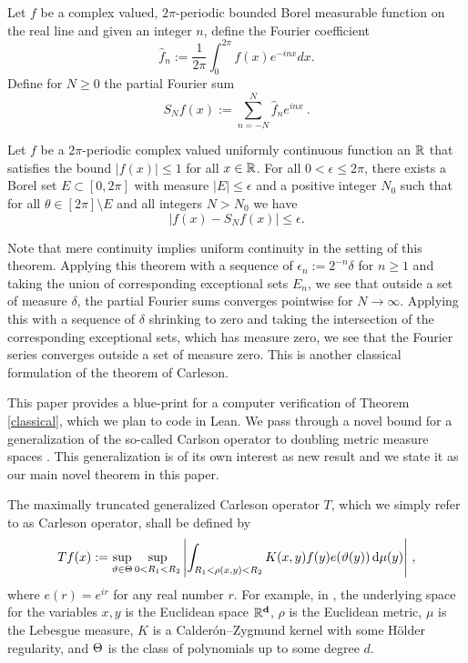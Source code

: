Let $f$ be a complex valued, $2\pi $-periodic bounded Borel measurable function on the real line and given an integer $n$, define the Fourier coefficient
\begin{equation}
    \widehat{f}_n:=\frac {1}{2\pi} \int_0^{2\pi} f(x) e^{- i nx} dx .
\end{equation}
Define for $N\ge 0$ the partial Fourier sum
\begin{equation}
    S_Nf(x):=\sum_{n=-N}^N \widehat{f}_n e^{i nx}\ .
\end{equation}
\begin{theorem}\label{classical}
Let $f$ be a $2\pi $-periodic complex valued uniformly continuous function an $\mathbb{R}$ that satisfies the bound
$|f(x)|\le 1$ for all $x\in \mathbb{R}$. For all $0<\epsilon\le 2\pi$,
there exists a Borel set $E\subset [0,2\pi]$ with measure
$|E|\le \epsilon$ and a positive integer $N_0$ such that for all
$\theta\in [2\pi]\setminus E$  and all integers $N>N_0$ we have
\begin{equation}\label{aeconv}
|f(x)-S_N f(x)|\le \epsilon.
\end{equation}
\end{theorem}

Note that mere continuity implies uniform continuity
in the setting of this theorem. Applying this theorem
with a sequence of $\epsilon_n:= 2^{-n}\delta$ for $n\ge 1$
and taking the union of corresponding exceptional sets $E_n$, we see that
outside a set of measure $\delta$, the partial Fourier sums
converges pointwise for $N\to \infty$. Applying this with a sequence
of $\delta$ shrinking to zero and taking the intersection of the corresponding exceptional
sets, which has measure zero, we see that the Fourier series converges outside
a set of measure zero. This is another classical formulation  of the theorem of Carleson.

This paper provides a blue-print for a computer verification of Theorem \ref{classical}, which we plan to code in Lean.
We pass through a novel bound for a
generalization of the so-called Carlson operator
to doubling metric measure spaces . This generalization is of its own interest as new result and we state it as our main novel theorem in this paper.

The maximally truncated generalized Carleson operator $T$, which we  simply refer to as Carleson operator, shall be defined by
    \begin{equation}
        \label{def main op}
        Tf(x):=\sup_{\vartheta\in\Theta} \sup_{0 < R_1 < R_2}\left| \int_{R_1 <  \rho(x,y) < R_2}  K(x,y) f(y) e(\vartheta(y)) \, \mathrm{d}\mu(y) \right|\, ,
\end{equation}
where $e(r)=e^{ir}$ for any real number $r$.
For example, in
\cite{zk-polynomial}, the underlying space for the variables $x,y$ is the Euclidean space $\mathbb{R}^{\bf d}$, $\rho$ is the Euclidean metric, $\mu$ is the Lebesgue measure,
$K$ is a Calder\'on--Zygmund kernel with some H\"older regularity,
and $\Theta$ is the
class of  polynomials up to some degree $d$.


